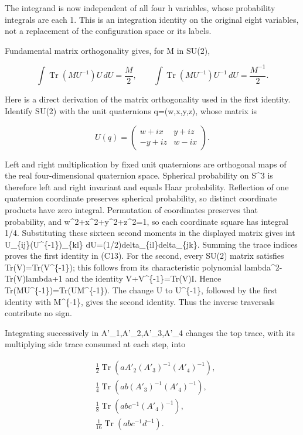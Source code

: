 \documentclass[11pt]{article}
\begin{document}
The integrand is now independent of all four h variables, whose probability integrals are each 1. This is an integration identity on the original eight variables, not a replacement of the configuration space or its labels.

Fundamental matrix orthogonality gives, for M in SU(2),

\[
 \int\operatorname{Tr}(MU^{-1})U\,dU=\frac M2,\qquad
 \int\operatorname{Tr}(MU^{-1})U^{-1}\,dU=\frac{M^{-1}}2. \tag{C13}
\]

Here is a direct derivation of the matrix orthogonality used in the first identity. Identify SU(2) with the unit quaternions q=(w,x,y,z), whose matrix is

\[
 U(q)=\begin{pmatrix}w+ix&y+iz\\-y+iz&w-ix\end{pmatrix}.
\]

Left and right multiplication by fixed unit quaternions are orthogonal maps of the real four-dimensional quaternion space. Spherical probability on S\textasciicircum{}3 is therefore left and right invariant and equals Haar probability. Reflection of one quaternion coordinate preserves spherical probability, so distinct coordinate products have zero integral. Permutation of coordinates preserves that probability, and w\textasciicircum{}2+x\textasciicircum{}2+y\textasciicircum{}2+z\textasciicircum{}2=1, so each coordinate square has integral 1/4. Substituting these sixteen second moments in the displayed matrix gives int U\_\{ij\}(U\textasciicircum{}\{-1\})\_\{kl\} dU=(1/2)delta\_\{il\}delta\_\{jk\}. Summing the trace indices proves the first identity in (C13). For the second, every SU(2) matrix satisfies Tr(V)=Tr(V\textasciicircum{}\{-1\}); this follows from its characteristic polynomial lambda\textasciicircum{}2-Tr(V)lambda+1 and the identity V+V\textasciicircum{}\{-1\}=Tr(V)I. Hence Tr(MU\textasciicircum{}\{-1\})=Tr(UM\textasciicircum{}\{-1\}). The change U to U\textasciicircum{}\{-1\}, followed by the first identity with M\textasciicircum{}\{-1\}, gives the second identity. Thus the inverse traversals contribute no sign.

Integrating successively in A'\_1,A'\_2,A'\_3,A'\_4 changes the top trace, with its multiplying side trace consumed at each step, into

\[
\begin{aligned}
 &\frac12\operatorname{Tr}(aA'_2(A'_3)^{-1}(A'_4)^{-1}),\\
 &\frac14\operatorname{Tr}(ab(A'_3)^{-1}(A'_4)^{-1}),\\
 &\frac18\operatorname{Tr}(abc^{-1}(A'_4)^{-1}),\\
 &\frac1{16}\operatorname{Tr}(abc^{-1}d^{-1}).
\end{aligned} \tag{C14}
\]
\end{document}
